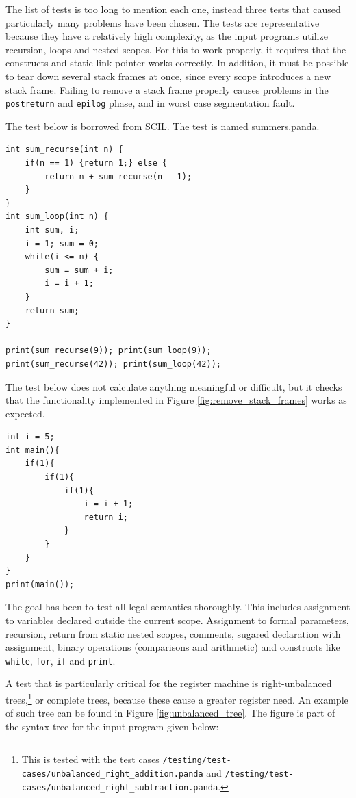 The list of tests is too long to mention each one, instead three tests that caused particularly many problems have been chosen. The tests are representative because they have a relatively high complexity, as the input programs utilize recursion, loops and nested scopes. For this to work properly, it requires that the constructs and static link pointer works correctly. In addition, it must be possible to tear down several stack frames at once, since every scope introduces a new stack frame. Failing to remove a stack frame properly causes problems in the \texttt{postreturn} and \texttt{epilog} phase, and in worst case segmentation fault. 

The test below is borrowed from SCIL. The test is named summers.panda.

\begin{verbatim}
int sum_recurse(int n) {
    if(n == 1) {return 1;} else {
        return n + sum_recurse(n - 1);
    }
}
int sum_loop(int n) {
    int sum, i;
    i = 1; sum = 0;
    while(i <= n) {
        sum = sum + i;
        i = i + 1;
    }
    return sum;
}

print(sum_recurse(9)); print(sum_loop(9));
print(sum_recurse(42)); print(sum_loop(42));
\end{verbatim}

The test below does not calculate anything meaningful or difficult, but it checks that the functionality implemented in Figure \ref{fig:remove_stack_frames} works as expected.

\begin{verbatim}
int i = 5;
int main(){
    if(1){
        if(1){
            if(1){
                i = i + 1;
                return i;
            }
        }
    }
}
print(main());
\end{verbatim}

The goal has been to test all legal semantics thoroughly. This includes assignment to variables declared outside the current scope. Assignment to formal parameters, recursion, return from static nested scopes, comments, sugared declaration with assignment, binary operations (comparisons and arithmetic) and constructs like \texttt{while}, \texttt{for}, \texttt{if} and \texttt{print}.

A test that is particularly critical for the register machine is right-unbalanced trees,\footnote{This is tested with the test cases \texttt{/testing/test-cases/unbalanced\_right\_addition.panda} and \texttt{/testing/test-cases/unbalanced\_right\_subtraction.panda}.} or complete trees, because these cause a greater register need. An example of such tree can be found in Figure \ref{fig:unbalanced_tree}. The figure is part of the syntax tree for the input program given below:

